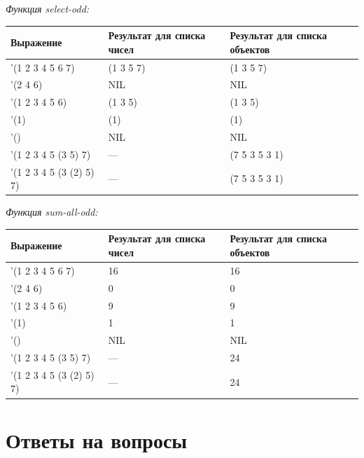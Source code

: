 \documentclass[a4paper,12pt]{article}
\begin{document}
 	
 	\textit{Функция select-odd:}
 	 \begin{table} [h!]
 		\begin{center}
 			\begin{tabular}{|l|l|l|}
 				\hline
 				{\bf  Выражение} & {\bf Результат для списка чисел} & {\bf Результат для списка объектов} \\
 				\hline
 				{'(1 2 3 4 5 6 7)} & (1 3 5 7) & (1 3 5 7)\\
 				\hline
 				{'(2 4 6)} & NIL & NIL\\
 				\hline
 				{'(1 2 3 4 5 6)} & (1 3 5) & (1 3 5)\\
 				\hline
 				{'(1)} & (1) & (1)\\
 				\hline
 				{'()} & NIL & NIL\\
 				\hline
 				{'(1 2 3 4 5 (3 5) 7)} & --- & (7 5 3 5 3 1)\\
 				\hline
 				{'(1 2 3 4 5 (3 (2) 5) 7)} & --- & (7 5 3 5 3 1)\\
 				\hline
 			\end{tabular}  
 			\label{m2}
 		\end{center}
 	\end{table}
 
 	\textit{Функция sum-all-odd:}
 	\begin{table} [h!]
 		\begin{center}
 			\begin{tabular}{|l|l|l|}
 				\hline
 				{\bf  Выражение} & {\bf Результат для списка чисел} & {\bf Результат для списка объектов} \\
 				\hline
 				{'(1 2 3 4 5 6 7)} & 16 & 16\\
				\hline
				{'(2 4 6)} & 0 & 0\\
				\hline
				{'(1 2 3 4 5 6)} & 9 & 9\\
				\hline
				{'(1)} & 1 & 1\\
				\hline
				{'()} & NIL & NIL\\
				\hline
				{'(1 2 3 4 5 (3 5) 7)} & --- & 24\\
				\hline
				{'(1 2 3 4 5 (3 (2) 5) 7)} & --- & 24\\
				\hline
 			\end{tabular}  
 			\label{m2}
 		\end{center}
 	\end{table}
 	
 	\section*{Ответы на вопросы}
 	
\end{document}
